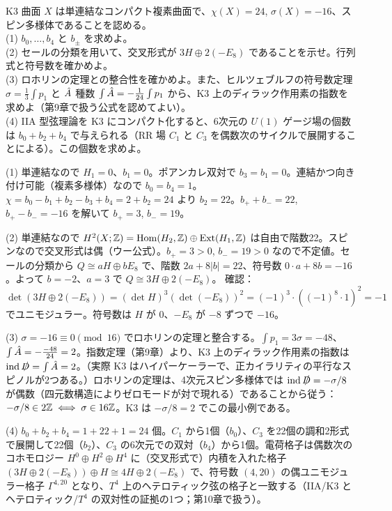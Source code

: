 \begin{problem}[難易度 C]\label{ch06-prob-k3}
K3 曲面 $X$ は単連結なコンパクト複素曲面で、$\chi(X)=24$, $\sigma(X)=-16$、スピン多様体であることを認める。\\
(1) $b_0,\dots,b_4$ と $b_\pm$ を求めよ。\\
(2) セールの分類を用いて、交叉形式が $3H\oplus2(-E_8)$ であることを示せ。行列式と符号数を確かめよ。\\
(3) ロホリンの定理との整合性を確かめよ。また、ヒルツェブルフの符号数定理 $\sigma=\frac13\int p_1$ と $\hat{A}$ 種数 $\int\hat{A}=-\frac{1}{24}\int p_1$ から、K3 上のディラック作用素の指数を求めよ（第9章で扱う公式を認めてよい）。\\
(4) IIA 型弦理論を K3 にコンパクト化すると、6次元の $U(1)$ ゲージ場の個数は $b_0+b_2+b_4$ で与えられる（RR 場 $C_1$ と $C_3$ を偶数次のサイクルで展開することによる）。この個数を求めよ。
\end{problem}

\begin{solution}
(1) 単連結なので $H_1=0$、$b_1=0$。ポアンカレ双対で $b_3=b_1=0$。連結かつ向き付け可能（複素多様体）なので $b_0=b_4=1$。$\chi=b_0-b_1+b_2-b_3+b_4=2+b_2=24$ より $b_2=22$。$b_++b_-=22$, $b_+-b_-=-16$ を解いて $b_+=3$, $b_-=19$。

(2) 単連結なので $H^2(X;\mathbb{Z})=\operatorname{Hom}(H_2,\mathbb{Z})\oplus\operatorname{Ext}(H_1,\mathbb{Z})$ は自由で階数22。スピンなので交叉形式は偶（ウー公式）。$b_+=3>0$, $b_-=19>0$ なので不定値。セールの分類から $Q\cong aH\oplus bE_8$ で、階数 $2a+8\lvert b\rvert=22$、符号数 $0\cdot a+8b=-16$。よって $b=-2$、$a=3$ で $Q\cong3H\oplus2(-E_8)$。
確認：$\det(3H\oplus2(-E_8))=(\det H)^3(\det(-E_8))^2=(-1)^3\cdot((-1)^8\cdot1)^2=-1$ でユニモジュラー。符号数は $H$ が $0$、$-E_8$ が $-8$ ずつで $-16$。

(3) $\sigma=-16\equiv0\pmod{16}$ でロホリンの定理と整合する。$\int p_1=3\sigma=-48$、$\int\hat{A}=-\frac{-48}{24}=2$。指数定理（第9章）より、K3 上のディラック作用素の指数は $\operatorname{ind}\slashed D=\int\hat{A}=2$。（実際 K3 はハイパーケーラーで、正カイラリティの平行なスピノルが2つある。）ロホリンの定理は、4次元スピン多様体では $\operatorname{ind}\slashed D=-\sigma/8$ が偶数（四元数構造によりゼロモードが対で現れる）であることから従う：$-\sigma/8\in2\mathbb{Z}\iff\sigma\in16\mathbb{Z}$。K3 は $-\sigma/8=2$ でこの最小例である。

(4) $b_0+b_2+b_4=1+22+1=24$ 個。$C_1$ から1個（$b_0$）、$C_3$ を22個の調和2形式で展開して22個（$b_2$）、$C_3$ の6次元での双対（$b_4$）から1個。電荷格子は偶数次のコホモロジー $H^0\oplus H^2\oplus H^4$ に（交叉形式で）内積を入れた格子 $(3H\oplus2(-E_8))\oplus H\cong4H\oplus2(-E_8)$ で、符号数 $(4,20)$ の偶ユニモジュラー格子 $\Gamma^{4,20}$ となり、$T^4$ 上のヘテロティック弦の格子と一致する（IIA/K3 とヘテロティック/$T^4$ の双対性の証拠の1つ；第10章で扱う）。
\end{solution}

